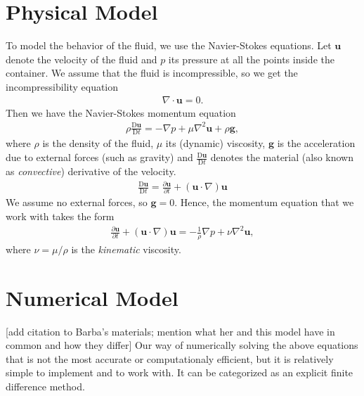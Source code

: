 \documentclass[11pt,a4paper,twoside,openright]{report}
\begin{document}
\section{Physical Model}
To model the behavior of the fluid, we use the Navier-Stokes equations. Let $\mathbf u$ denote the velocity of the fluid and $p$ its pressure at all the points inside the container. We assume that the fluid is incompressible, so we get the incompressibility equation
\newcommand{\uu}{\mathbf u}
\newcommand{\D}{\mathrm D}
\begin{align}\label{eq:incom}
	\nabla\cdot\uu=0.
\end{align}
Then we have the Navier-Stokes momentum equation
\newcommand{\conv}{\frac{\D\uu}{\D t}}
\begin{align*}
	\rho\conv=-\nabla p+\mu\nabla^2\uu+\rho\mathbf g,
\end{align*}
where $\rho$ is the density of the fluid, $\mu$ its (dynamic) viscosity, $\mathbf g$ is the acceleration due to external forces (such as gravity) and $\conv$ denotes the material (also known as \emph{convective}) derivative of the velocity.
\newcommand{\pder}[2]{\frac{\partial #1}{\partial #2}}
\begin{align}
	\conv=\pder\uu t+(\uu\cdot\nabla)\uu
\end{align}
We assume no external forces, so $\mathbf g=0$. Hence, the momentum equation that we work with takes the form
\begin{align}\label{eq:momentum}
	\pder\uu t+(\uu\cdot\nabla)\uu=-\frac1\rho\nabla p+\nu\nabla^2\uu,
\end{align}
where $\nu=\mu/\rho$ is the \emph{kinematic} viscosity.
\section{Numerical Model}
[add citation to Barba's materials; mention what her and this model have in common and how they differ]
Our way of numerically solving the above equations that is not the most accurate or computationaly efficient, but it is relatively simple to implement and to work with. It can be categorized as an explicit finite difference method.
\end{document}
